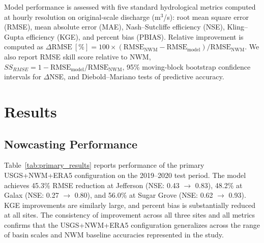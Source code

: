\documentclass[draft]{agujournal2019}
\begin{document}
Model performance is assessed with five standard hydrological metrics computed at hourly resolution on original-scale discharge (m$^{3}$/s): root mean square error (RMSE), mean absolute error (MAE), Nash--Sutcliffe efficiency (NSE), Kling--Gupta efficiency (KGE), and percent bias (PBIAS). Relative improvement is computed as $\Delta\text{RMSE}~[\%] = 100 \times (\text{RMSE}_{\text{NWM}} - \text{RMSE}_{\text{model}}) / \text{RMSE}_{\text{NWM}}$. We also report RMSE skill score relative to NWM, $SS_{RMSE} = 1 - \text{RMSE}_{\text{model}}/\text{RMSE}_{\text{NWM}}$, 95\% moving-block bootstrap confidence intervals for $\Delta$NSE, and Diebold--Mariano tests of predictive accuracy.



\section{Results}

\subsection{Nowcasting Performance}

Table~\ref{tab:primary_results} reports performance of the primary USGS+NWM+ERA5 configuration on the 2019--2020 test period. The model achieves 45.3\% RMSE reduction at Jefferson (NSE: 0.43 $\to$ 0.83), 48.2\% at Galax (NSE: 0.27 $\to$ 0.80), and 56.0\% at Sugar Grove (NSE: 0.62 $\to$ 0.93). KGE improvements are similarly large, and percent bias is substantially reduced at all sites. The consistency of improvement across all three sites and all metrics confirms that the USGS+NWM+ERA5 configuration generalizes across the range of basin scales and NWM baseline accuracies represented in the study.
\end{document}
